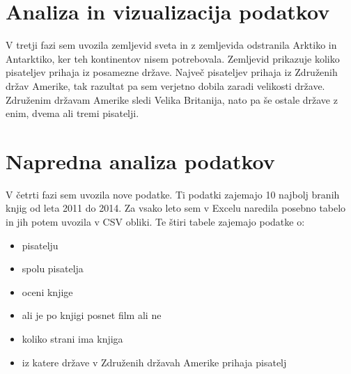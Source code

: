 \documentclass[11pt,a4paper]{article}
\begin{document}
\pagebreak
\section{Analiza in vizualizacija podatkov}

V tretji fazi sem uvozila zemljevid sveta in z zemljevida odstranila Arktiko in Antarktiko, ker teh kontinentov nisem potrebovala. Zemljevid prikazuje koliko pisateljev prihaja iz posamezne države. Največ pisateljev prihaja iz Združenih držav Amerike, tak razultat pa sem verjetno dobila zaradi velikosti države. Združenim državam Amerike sledi Velika Britanija, nato pa še ostale države z enim, dvema ali tremi pisatelji. 


\newpage
\section{Napredna analiza podatkov}

V četrti fazi sem uvozila nove podatke. Ti podatki zajemajo 10 najbolj branih knjig od leta 2011 do 2014. Za vsako leto sem v Excelu naredila posebno tabelo in jih potem uvozila v CSV obliki. Te štiri tabele zajemajo podatke o:
\begin{itemize}
\item pisatelju
\item spolu pisatelja
\item oceni knjige
\item ali je po knjigi posnet film ali ne
\item koliko strani ima knjiga
\item iz katere države v Združenih državah Amerike prihaja pisatelj
\end{itemize}
\end{document}
